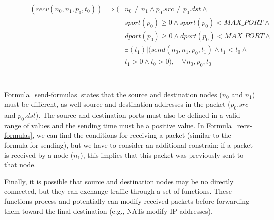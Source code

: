 \begin{figure}[h]
		{\footnotesize
			\begin{subequations}
				\begin{align}
					\begin{split}
						\label{recv-formulas}
 					    (recv(n_{0}, n_{1}, p_{0}, t_{0})) \implies (& n_{0} \neq n_{1} \wedge p_{0}.src \neq p_{0}.dst \wedge \\
 					    & sport(p_{0}) \geq 0 \wedge sport(p_{0}) < MAX\_PORT \wedge \\
 					    & dport(p_{0}) \geq 0 \wedge dport(p_{0}) < MAX\_PORT \wedge \\
 					    &\exists (t_{1}) | (send(n_{0}, n_{1}, p_{0}, t_{1}) \wedge t_{1} < t_{0} \wedge \\
 					    & t_{1} > 0 \wedge t_{0} > 0 ), \quad \forall n_{0}, p_{0}, t_{0} \\
					\end{split}
				\end{align}
				\label{formula1}
			\end{subequations}}
\end{figure} \\
Formula~\ref{send-formulas} states that the source and destination nodes (\textit{$n_0$} and \textit{$n_1$}) must be different, as well source and destination addresses in the packet (\textit{$p_0.src$} and \textit{$p_0.dst$}). The source and destination ports must also be defined in a valid range of values and the sending time must be a positive value. In Formula~\ref{recv-formulas}, we can find the conditions for receiving a packet (similar to the formula for sending), but we have to consider an additional constrain: if a packet is received by a node (\textit{$n_1$}), this implies that this packet was previously sent to that node.   

Finally, it is possible that source and destination nodes may be no directly connected, but they can exchange traffic through a set of functions. These functions process and potentially can modify received packets before forwarding them toward the final destination (e.g., NATs modify IP addresses). 

